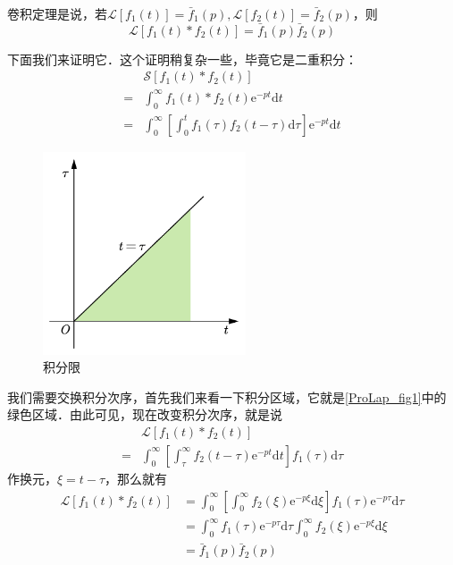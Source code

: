 卷积定理是说，若$\mathscr L[f_1(t)] = \bar f_1(p), \mathscr L[f_2(t)] = \bar f_2(p)$，则
\begin{equation}
\mathscr L[f_{1}(t) * f_{2}(t) ]= \bar{f}_{1}(p) \bar{f}_{2}(p)
\end{equation}

下面我们来证明它．这个证明稍复杂一些，毕竟它是二重积分：
\begin{equation}
\begin{aligned} & \mathscr{S}\left[f_{1}(t) * f_{2}(t)\right] \\=& \int_{0}^{\infty} f_{1}(t) * f_{2}(t) \mathrm{e}^{-p t} \mathrm{d} t \\=& \int_{0}^{\infty}\left[\int_{0}^{t} f_{1}(\tau) f_{2}(t-\tau) \mathrm{d} \tau\right] \mathrm{e}^{-p t} \mathrm{d} t \end{aligned}
\end{equation}
\begin{figure}[ht]
\centering
\includegraphics[width=6cm]{./figures/ProLap_1.pdf}
\caption{积分限} \label{ProLap_fig1}
\end{figure}
我们需要交换积分次序，首先我们来看一下积分区域，它就是\autoref{ProLap_fig1}中的绿色区域．由此可见，现在改变积分次序，就是说
\begin{equation}
\begin{aligned} & \mathscr{L}\left[f_{1}(t) * f_{2}(t)\right] \\=& \int_{0}^{\infty}\left[\int_{\tau}^{\infty} f_{2}(t-\tau) \mathrm{e}^{-p t} \mathrm{d} t\right] f_{1}(\tau) \mathrm{d} \tau \end{aligned}
\end{equation}
作换元，$\xi=t-\tau$，那么就有
\begin{equation}
\begin{aligned} \mathscr{L}\left[f_{1}(t) * f_{2}(t)\right] &=\int_{0}^{\infty}\left[\int_{0}^{\infty} f_{2}(\xi) \mathrm{e}^{-p \xi} \mathrm{d} \xi\right] f_{1}(\tau) \mathrm{e}^{-p \tau} \mathrm{d} \tau \\ &=\int_{0}^{\infty} f_{1}(\tau) \mathrm{e}^{-p \tau} \mathrm{d} \tau \int_{0}^{\infty} f_{2}(\xi) \mathrm{e}^{-p \xi} \mathrm{d} \xi \\ &=\bar{f}_{1}(p) \bar{f}_{2}(p) \end{aligned}
\end{equation}

